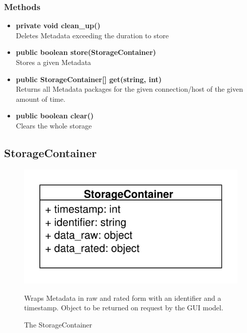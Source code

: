\subsubsection{Methods}
\begin{itemize}
	\item \textbf{private void clean\_up()}\\
	Deletes Metadata exceeding the duration to store
	\item \textbf{public boolean store(StorageContainer)}\\
	Stores a given Metadata
	\item \textbf{public StorageContainer[] get(string, int)}\\
	Returns all Metadata packages for the given connection/host of the given amount of time.
	\item \textbf{public boolean clear()}\\
	Clears the whole storage
\end{itemize}


\subsection{StorageContainer}
\begin{figure}[htbp]
	\begin{minipage}[t]{7cm}
		\vspace{0pt}
		\centering
		\includegraphics[scale=0.6]{./diagram_pictures/StorageContainer.pdf}
		\caption{The StorageContainer}
	\end{minipage}
	\hfill
	\begin{minipage}[t]{8cm}
		\vspace{10pt}
		Wraps Metadata in raw and rated form with an identifier and a timestamp. Object to be returned on request by the GUI model.
	\end{minipage}
\end{figure}

